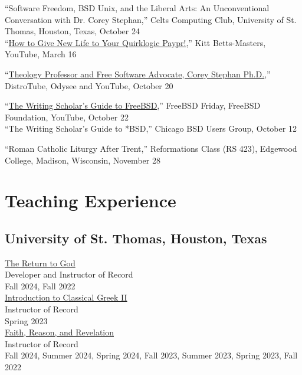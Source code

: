 \documentclass[letterpaper,12pt]{article}
\newcommand{\years}[1]{%
  {\reversemarginpar\strut\marginnote{{\small#1}}}%
}
\begin{document}
{{{{{{{\years{2023}%
%
``Software Freedom, BSD Unix, and the Liberal Arts: An Unconventional Conversation with Dr. Corey Stephan,'' Celts Computing Club, University of St. Thomas, Houston, Texas, October 24 \\ [.3cm]
%
``\href{https://www.youtube.com/watch?v=_IBIjZKasjQ}{How to Give New Life to Your Quirklogic Paypr!},'' Kitt Betts-Masters, YouTube, March 16 \\ [.3cm]
%
\years{2022}%
%
``\href{https://odysee.com/@DistroTube:2/theology-professor-and-free-software:b}{Theology Professor and Free Software Advocate, Corey Stephan Ph.D.},'' DistroTube, Odysee and YouTube, October 20 \\ [.3cm]
%
\years{2021}%
%
``\href{https://www.youtube.com/watch?v=BYTNpuinaPU}{The Writing Scholar’s Guide to FreeBSD},'' FreeBSD Friday, FreeBSD Foundation, YouTube, October 22 \\ [.3cm]
%
``The Writing Scholar’s Guide to *BSD,'' Chicago BSD Users Group, October 12 \\ [.3cm]
%
\years{2017}%
%
``Roman Catholic Liturgy After Trent,'' Reformations Class (RS 423), Edgewood College, Madison, Wisconsin, November 28

\section*{Teaching Experience}

\subsection*{University of St. Thomas, Houston, Texas}

\href{https://www.coreystephan.com/teaching/return-to-god/}{The Return to God} \\
Developer and Instructor of Record \\
Fall 2024, Fall 2022 \\ [.3cm]
%
\href{https://www.coreystephan.com/teaching/greek/}{Introduction to Classical Greek II} \\
Instructor of Record \\
Spring 2023 \\ [.3cm]
%
\href{https://www.coreystephan.com/teaching/faith-reason-revelation/}{Faith, Reason, and Revelation} \\
Instructor of Record \\
Fall 2024, Summer 2024, Spring 2024, Fall 2023, Summer 2023, Spring 2023, Fall 2022

}}}}}}}
\end{document}
